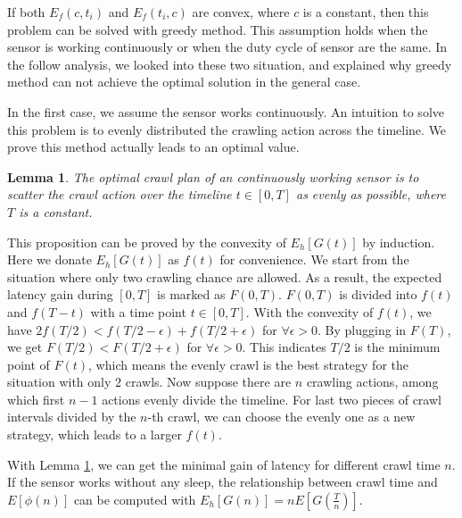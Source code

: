 \documentclass[conference]{IEEEtran}
\newtheorem{lemma}{Lemma}
\begin{document}
If both $E_f(c, t_i)$ and $E_f(t_i,c)$ are convex, where $c$ is a constant, then this problem can be solved with greedy method. 
This assumption holds when the sensor is working continuously or when the duty cycle of sensor are the same.
In the follow analysis, we looked into these two situation, and explained why greedy method can not achieve the optimal solution in the general case.

In the first case, we assume the sensor works continuously.
An intuition to solve this problem is to evenly distributed the crawling action across the timeline. 
We prove this method actually leads to an optimal value.
\begin{lemma}
\label{evenly}
The optimal crawl plan of an continuously working sensor is to scatter the crawl action over the timeline $t\in [0, T]$ as evenly as possible, where $T$ is a constant.
\end{lemma}
\begin{IEEEproof}
This proposition can be proved by the convexity of $E_h[G(t)]$ \cite{boyd2004convex} by induction. 
Here we donate $E_h[G(t)]$ as $f(t)$ for convenience.
We start from the situation where only two crawling chance are allowed. 
As a result, the expected latency gain during $[0,T]$ is marked as $F(0, T)$.
$F(0,T)$ is divided into $f(t)$ and $f(T-t)$ with a time point $t\in[0,T]$. 
With the convexity of $f(t)$, we have $2f(T/2)<f(T/2-\epsilon)+f(T/2+\epsilon)$ for $\forall{\epsilon>0}$. 
By plugging in $F(T)$, we get $F(T/2)<F(T/2+\epsilon)$ for $\forall{\epsilon>0}$.
This indicates $T/2$ is the minimum point of $F(t)$, which means the evenly crawl is the best strategy for the situation with only $2$ crawls.
Now suppose there are $n$ crawling actions, among which first $n-1$ actions evenly divide the timeline.
For last two pieces of crawl intervals divided by the $n$-th crawl, we can choose the evenly one as a new strategy, which leads to a larger $f(t)$.
\end{IEEEproof}

With Lemma \ref{evenly}, we can get the minimal gain of latency for different crawl time $n$.
If the sensor works without any sleep, the relationship between crawl time and $E[\phi(n)]$ can be computed with $E_h[G(n)]=nE[G(\frac{T}{n})]$.
\end{document}
